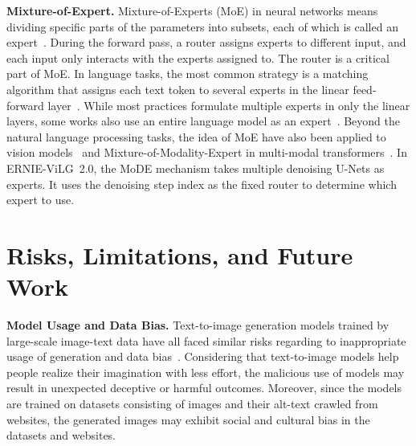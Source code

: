 \documentclass[10pt,twocolumn,letterpaper]{article}
\begin{document}
\noindent\textbf{Mixture-of-Expert.}
Mixture-of-Experts (MoE) in neural networks means dividing specific parts of the parameters into subsets, each of which is called an expert~\cite{DBLP:conf/iclr/ShazeerMMDLHD17,DBLP:journals/corr/abs-2209-01667}. During the forward pass, a router assigns experts to different input, and each input only interacts with the experts assigned to.
The router is a critical part of MoE.
In language tasks, the most common strategy is a matching algorithm that assigns each text token to several experts in the linear feed-forward layer~\cite{DBLP:conf/iclr/LepikhinLXCFHKS21,DBLP:journals/corr/abs-2101-03961,DBLP:conf/nips/RollerSSW21,DBLP:conf/naacl/GururanganLHSZ22}. 
While most practices formulate multiple experts in only the linear layers, some works also use an entire language model as an expert~\cite{DBLP:journals/corr/abs-2208-03306}.
Beyond the natural language processing tasks, the idea of MoE have also been applied to vision models~\cite{DBLP:conf/iclr/PuigcerverRMRPG21} and Mixture-of-Modality-Expert in multi-modal transformers~\cite{DBLP:journals/corr/abs-2111-02358,DBLP:journals/corr/abs-2208-10442,DBLP:journals/corr/abs-2206-02770}.
In ERNIE-ViLG~2.0, the MoDE mechanism takes multiple denoising U-Nets as experts. It uses the denoising step index as the fixed router to determine which expert to use. 



\section{Risks, Limitations, and Future Work}\label{sec:risk}

\noindent\textbf{Model Usage and Data Bias.}
Text-to-image generation models trained by large-scale image-text data have all faced similar risks regarding to inappropriate usage of generation and data bias~\cite{DBLP:journals/corr/abs-2112-10752,DBLP:journals/corr/abs-2204-06125,DBLP:journals/corr/abs-2205-11487}.
Considering that text-to-image models help people realize their imagination with less effort, the malicious use of models may result in unexpected deceptive or harmful outcomes. 
Moreover, since the models are trained on datasets consisting of images and their alt-text crawled from websites, the generated images may exhibit social and cultural bias in the datasets and websites.
\end{document}
